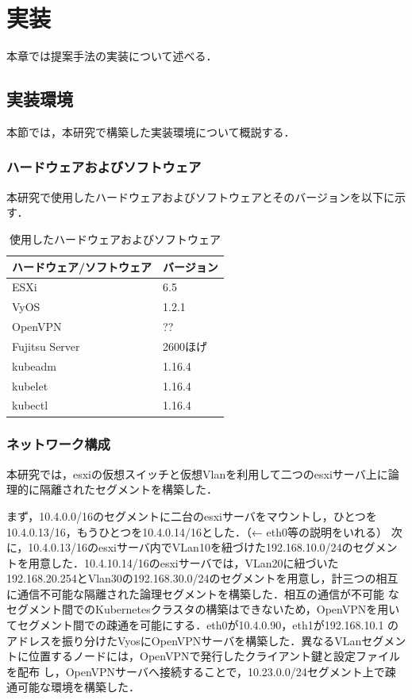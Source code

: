 \chapter{実装}
\label{implementation}

本章では提案手法の実装について述べる．

\section{実装環境}
\label{implementation:environment}
本節では，本研究で構築した実装環境について概説する．

\subsection{ハードウェアおよびソフトウェア}
\label{implementation:environment:resouces}
本研究で使用したハードウェアおよびソフトウェアとそのバージョンを以下に示す．

\begin{table}[htb]
  \begin{center}
    \caption{使用したハードウェアおよびソフトウェア}
    \begin{tabular}{|l|l|} \hline
      ハードウェア/ソフトウェア & バージョン \\ \hline
      ESXi & 6.5 \\ \hline
      VyOS & 1.2.1 \\ \hline
      OpenVPN & ?? \\ \hline
      Fujitsu Server & 2600ほげ \\ \hline
      kubeadm & 1.16.4 \\ \hline
      kubelet & 1.16.4 \\ \hline
      kubectl & 1.16.4 \\ \hline
    \end{tabular}
  \end{center}
\end{table}

\subsection{ネットワーク構成}
\label{implementation:network-environment}
本研究では，esxiの仮想スイッチと仮想Vlanを利用して二つのesxiサーバ上に論理的に隔離されたセグメントを構築した．

まず，10.4.0.0/16のセグメントに二台のesxiサーバをマウントし，ひとつを10.4.0.13/16，もうひとつを10.4.0.14/16とした．（← eth0等の説明をいれる）
次に，10.4.0.13/16のesxiサーバ内でVLan10を紐づけた192.168.10.0/24のセグメントを用意した．10.4.10.14/16のesxiサーバでは，VLan20に紐づいた
192.168.20.254とVlan30の192.168.30.0/24のセグメントを用意し，計三つの相互に通信不可能な隔離された論理セグメントを構築した．相互の通信が不可能
なセグメント間でのKubernetesクラスタの構築はできないため，OpenVPNを用いてセグメント間での疎通を可能にする．eth0が10.4.0.90，eth1が192.168.10.1
のアドレスを振り分けたVyosにOpenVPNサーバを構築した．異なるVLanセグメントに位置するノードには，OpenVPNで発行したクライアント鍵と設定ファイルを配布
し，OpenVPNサーバへ接続することで，10.23.0.0/24セグメント上で疎通可能な環境を構築した．


